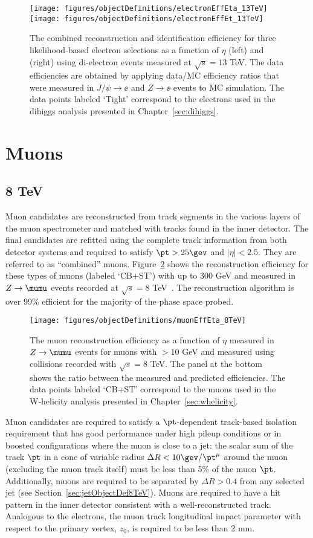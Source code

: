 \begin{figure}[h!]
  \centering
  \label{fig:electronEff13TeV}
  \texttt{[image: figures/objectDefinitions/electronEffEta\_13TeV]}
  \texttt{[image: figures/objectDefinitions/electronEffEt\_13TeV]}
  \caption{The combined reconstruction and identification efficiency for three likelihood-based electron selections as a function of $\eta$ (left) and \et (right) using di-electron events measured at $\sqrt{s}=13$ TeV. The data efficiencies are obtained by applying data/MC efficiency ratios that were measured in $J/\psi\rightarrow \ee$ and $Z\rightarrow \ee$ events to MC simulation. The data points labeled `Tight' correspond to the electrons used in the dihiggs analysis presented in Chapter~\ref{sec:dihiggs}.}
\end{figure}


\section{Muons}
\subsection{8 TeV}
Muon candidates are reconstructed from track segments in the various layers of the muon spectrometer and matched with tracks found in the inner detector. The final candidates are refitted using the complete
track information from both detector systems and required to satisfy $\pt > 25\gev$ and $|\eta|<2.5$. They are referred to as ``combined'' muons. Figure~\ref{fig:muonEff8TeV} shows the reconstruction efficiency for these types of muons (labeled `CB+ST') with \pt up to 300 GeV and measured in $Z\rightarrow\mumu$ events recorded at $\sqrt{s}=8$ TeV~\cite{Aad:2014rra}. The reconstruction algorithm is over 99\% efficient for the majority of the phase space probed.
\begin{figure}[h!]
  \centering
  \label{fig:muonEff8TeV}
  \texttt{[image: figures/objectDefinitions/muonEffEta\_8TeV]}
  \caption{The muon reconstruction efficiency as a function of $\eta$ measured in $Z\rightarrow\mumu$ events for muons with \pt$>$10 GeV and measured using collisions recorded with $\sqrt{s}=8$ TeV. The panel at the bottom shows the ratio between the measured and predicted efficiencies. The data points labeled `CB+ST' correspond to the muons used in the W-helicity analysis presented in Chapter~\ref{sec:whelicity}.}
\end{figure}
Muon candidates are required to satisfy a $\pt$-dependent track-based isolation requirement that has good performance under high pileup conditions or in boosted configurations where the muon is close to a jet:  the scalar sum of the track $\pt$ in a cone of variable radius $\Delta R < 10\gev/\pt^\mu$ around the muon (excluding the muon track itself) must be less than 5\% of the muon $\pt$. Additionally, muons are required to be separated by $\Delta R > 0.4 $ from any selected jet (see Section~\ref{sec:jetObjectDef8TeV}). Muons are required to have a hit pattern in the inner detector consistent with a well-reconstructed track. Analogous to the electrons, the muon track longitudinal impact parameter with respect to the primary vertex, $z_{0}$, is required to be less than 2 mm.

